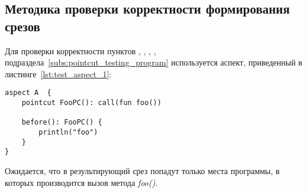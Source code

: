 \subsection{Методика проверки корректности формирования срезов}
\label{sub:pointcut_building_methodology}
Для проверки корректности пунктов
\quotes{\ref{list:method_name_check}},
\quotes{\ref{list:class_name_check}},
\quotes{\ref{list:method_params_check}},
\quotes{\ref{list:call_check}},
\quotes{\ref{list:reference_pointcut_check}} подраздела~\ref{subs:pointcut_testing_program} используется аспект, приведенный в листинге~\ref{lst:test_aspect_1}:
\begin{lstlisting}[style={java}, label={lst:test_aspect_1},
  caption={Пример тестового аспекта}]
aspect A  {
    pointcut FooPC(): call(fun foo())

    before(): FooPC() {
        println("foo")
    }
}
\end{lstlisting}

Ожидается, что в результирующий срез попадут только места программы, в которых производится вызов метода \textit{foo()}.

